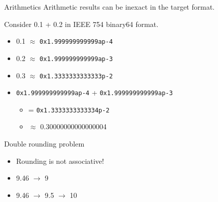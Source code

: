 \documentclass{beamer}
\begin{document}
\begin{frame}{Arithmetics}
    Arithmetic results can be inexact in the target format.
    
    \begin{example}
        Consider 0.1 + 0.2 in IEEE 754 binary64 format.

        \begin{itemize}
            \item 0.1 $\approx$ \texttt{0x1.999999999999ap-4}
            \item 0.2 $\approx$ \texttt{0x1.999999999999ap-3}
            \item 0.3 $\approx$ \texttt{0x1.3333333333333p-2}
            \item \texttt{0x1.999999999999ap-4} + \texttt{0x1.999999999999ap-3}
                \begin{itemize}
                    \item[] = \texttt{0x1.3333333333334p-2}
                    \item[] $\approx$ 0.30000000000000004
                \end{itemize}
        \end{itemize}
    \end{example}
\end{frame}

\begin{frame}{Double rounding problem}
    \begin{itemize}
        \item Rounding is not associative!
        \item 9.46 $\to$ 9
        \item 9.46 $\to$ 9.5 $\to$ 10
    \end{itemize}
\end{frame}
\end{document}
